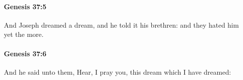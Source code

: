 		\paragraph{Genesis 37:5} %
			\label{GENESIS-37-5}

			And Joseph dreamed a dream, and he told it his brethren: and they hated him yet the more.


		\paragraph{Genesis 37:6} %
			\label{GENESIS-37-6}

			And he said unto them, Hear, I pray you, this dream which I have dreamed:



